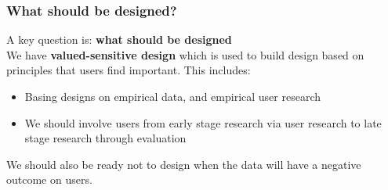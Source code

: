 \documentclass{article}
\begin{document}
\subsubsection*{What should be designed?}
A key question is: \textbf{what should be designed} \\
We have \textbf{valued-sensitive design} which is used to build design based on principles that users find important. This includes:
\begin{itemize}
    \item Basing designs on empirical data, and empirical user research
    \item We should involve users from early stage research via user research to late stage research through evaluation
\end{itemize}
We should also be ready not to design when the data will have a negative outcome on users. 
\end{document}
